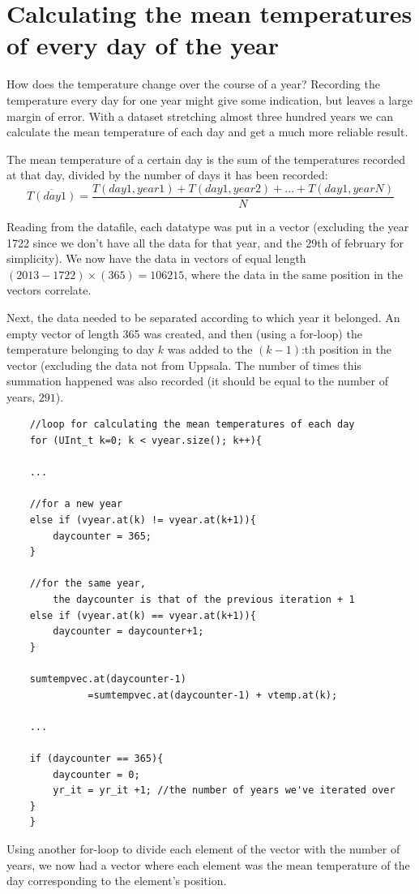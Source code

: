 \documentclass[a4paper,12pt,twoside]{article}
\begin{document}
 \section{Calculating the mean temperatures of every day of the year}
 \label{sec:3.2}
 How does the temperature change over the course of a year? Recording the temperature
 every day for one year might give some indication, but leaves a large margin of error.
 With a dataset stretching almost three hundred years we can calculate the mean
 temperature of each day and get a much more reliable result.
 
 The mean temperature of a certain day is the sum of the temperatures recorded at
 that day, divided by the number of days it has been recorded:
 \begin{equation}
  \label{eq:MeanTempPerDay}
  \overline{T(day 1)} = \frac{T(day 1, year 1)+T(day 1, year 2)+...+T(day 1, year N)}{N}
 \end{equation} 
  
 
 Reading from the datafile, each datatype was put in a vector (excluding the year
 1722 since we don't have all the data for that year, and the 29th of february for
 simplicity). We now have the data in vectors of equal length $(2013-1722)\times(365)=106215$,
 where the data in the same position in the vectors correlate.
 
 Next, the data needed to be separated according to which year it belonged. An empty
 vector of length 365 was created, and then (using a for-loop) the temperature belonging
 to day $k$ was added to the $(k-1)$:th position in the vector (excluding the data not from
 Uppsala. The number of times this summation happened was also recorded (it should be
 equal to the number of years, $291$).
 
 \begin{verbatim}
  	//loop for calculating the mean temperatures of each day
	for (UInt_t k=0; k < vyear.size(); k++){
	
	...
	
	//for a new year
	else if (vyear.at(k) != vyear.at(k+1)){
		daycounter = 365;
	}
	
	//for the same year,
	    the daycounter is that of the previous iteration + 1
	else if (vyear.at(k) == vyear.at(k+1)){
		daycounter = daycounter+1;
	}
	
	sumtempvec.at(daycounter-1)
	          =sumtempvec.at(daycounter-1) + vtemp.at(k);
	
	...
	
	if (daycounter == 365){
		daycounter = 0;
		yr_it = yr_it +1; //the number of years we've iterated over
	}
	}
 \end{verbatim}
 Using another for-loop to divide each element of the vector with the number of years,
 we now had a vector where each element was the mean temperature of the day
 corresponding to the element's position.
 
\end{document}
